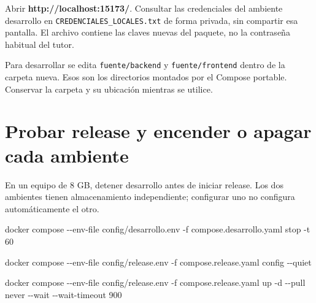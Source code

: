 \documentclass[
  spanish,
  10pt,
  a4paper,
]{article}
\newenvironment{Shaded}{}{}
\newcommand{\AttributeTok}[1]{#1}
\newcommand{\ExtensionTok}[1]{#1}
\newcommand{\NormalTok}[1]{#1}
\renewenvironment{Shaded}{\begin{snugshade}}{\end{snugshade}}%
\begin{document}
Abrir \textbf{http://localhost:15173/}. Consultar las credenciales del
ambiente desarrollo en \texttt{CREDENCIALES\_LOCALES.txt} de forma
privada, sin compartir esa pantalla. El archivo contiene las claves
nuevas del paquete, no la contraseña habitual del tutor.

Para desarrollar se edita \texttt{fuente/backend} y
\texttt{fuente/frontend} dentro de la carpeta nueva. Esos son los
directorios montados por el Compose portable. Conservar la carpeta y su
ubicación mientras se utilice.

\clearpage

\section{Probar release y encender o apagar cada
ambiente}\label{probar-release-y-encender-o-apagar-cada-ambiente}

En un equipo de 8 GB, detener desarrollo antes de iniciar release. Los
dos ambientes tienen almacenamiento independiente; configurar uno no
configura automáticamente el otro.

\begin{Shaded}
\begin{Highlighting}[]
\ExtensionTok{docker}\NormalTok{ compose }\AttributeTok{{-}{-}env{-}file}\NormalTok{ config/desarrollo.env }\AttributeTok{{-}f}\NormalTok{ compose.desarrollo.yaml stop }\AttributeTok{{-}t}\NormalTok{ 60}
\end{Highlighting}
\end{Shaded}

\begin{Shaded}
\begin{Highlighting}[]
\ExtensionTok{docker}\NormalTok{ compose }\AttributeTok{{-}{-}env{-}file}\NormalTok{ config/release.env }\AttributeTok{{-}f}\NormalTok{ compose.release.yaml config }\AttributeTok{{-}{-}quiet}
\end{Highlighting}
\end{Shaded}

\begin{Shaded}
\begin{Highlighting}[]
\ExtensionTok{docker}\NormalTok{ compose }\AttributeTok{{-}{-}env{-}file}\NormalTok{ config/release.env }\AttributeTok{{-}f}\NormalTok{ compose.release.yaml up }\AttributeTok{{-}d} \AttributeTok{{-}{-}pull}\NormalTok{ never }\AttributeTok{{-}{-}wait} \AttributeTok{{-}{-}wait{-}timeout}\NormalTok{ 900}
\end{Highlighting}
\end{Shaded}
\end{document}
